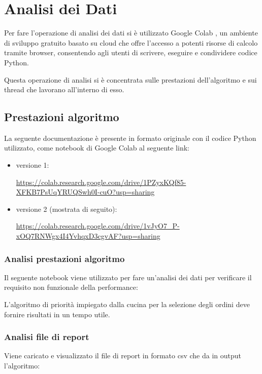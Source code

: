 \section{Analisi dei Dati}
\label{sec:analDati}

Per fare l'operazione di analisi dei dati si è utilizzato Google Colab \cite{googlecolab}, un ambiente di sviluppo gratuito basato su cloud che offre l'accesso a potenti risorse di calcolo tramite browser, consentendo agli utenti di scrivere, eseguire e condividere codice Python.

Questa operazione di analisi si è concentrata sulle prestazioni dell'algoritmo e sui thread che lavorano all'interno di esso.

\subsection{Prestazioni algoritmo}
La seguente documentazione è presente in formato originale con il codice Python utilizzato, come notebook di Google Colab al seguente link:

\begin{itemize}
	\item versione 1:
	
	 {\footnotesize \href{https://colab.research.google.com/drive/1PZyxKQf85-XFKB7PsUqYRUQSwh0I-cuO?usp=sharing}{https://colab.research.google.com/drive/1PZyxKQf85-XFKB7PsUqYRUQSwh0I-cuO?usp=sharing}}
	 
	 \item versione 2 (mostrata di seguito):
	 
	 {\footnotesize \href{https://colab.research.google.com/drive/1vJyO7_P-xOQ7RNWgx4I4YvhqxD3cgvAF?usp=sharing}{https://colab.research.google.com/drive/1vJyO7\_P-xOQ7RNWgx4I4YvhqxD3cgvAF?usp=sharing}}

\end{itemize}


\subsubsection{Analisi prestazioni algoritmo}
Il seguente notebook viene utilizzato per fare un'analisi dei dati per verificare il requisito non funzionale della performance:

L’algoritmo di priorità impiegato dalla cucina per la selezione degli ordini deve fornire risultati in un tempo utile.

\subsubsection{Analisi file di report}
Viene caricato e visualizzato il file di report in formato csv che da in output l'algoritmo:

